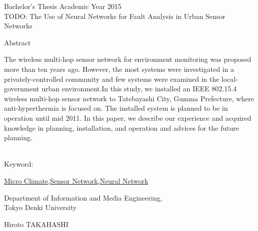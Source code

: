 \begin{center}
\LARGE{Bachelor's Thesis Academic Year 2015}\\

\vspace{10mm}
\LARGE{TODO: The Use of Neural Networks for Fault Analysis in Urban Sensor Networks}\\
\end{center}
\begin{center}
Abstract\\
\end{center}
The wireless multi-hop sensor network for environment monitoring was proposed more than ten years ago. However, the most systems were investigated in a privately-controlled community and few systems were examined in the local-government urban environment.In this study, we installed an IEEE 802.15.4 wireless multi-hop sensor network to Tatebayashi City, Gumma Prefecture, where anti-hyperthermia is focused on. The installed system is planned to be in operation until mid 2011. In this paper, we describe our experience and acquired knowledge in planning, installation, and operation and advices for the future planning.
\\\\

\begin{flushleft}Keyword:\\
\end{flushleft}
{\underline{Micro Climate},\underline{Sensor Network},\underline{Neural Network}}

\begin{flushright}
\vspace{10mm}

\vspace{5mm}
\large Department of Information and Media Engineering,\\
Tokyo Denki University\\
\begin{flushright}\LARGE Hiroto TAKAHASHI\\
\end{flushright}

\end{flushright}

